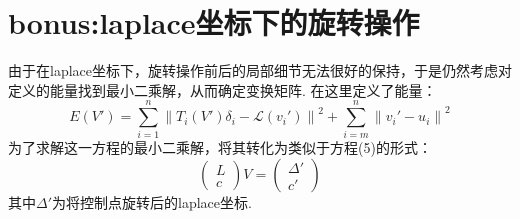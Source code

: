 \documentclass[12pt]{article}
\begin{document}
\begin{figure}[htbp]
    \centering
\end{figure}

\section{bonus:laplace坐标下的旋转操作}

由于在laplace坐标下，旋转操作前后的局部细节无法很好的保持，于是仍然考虑对定义的能量找到最小二乘解，从而确定变换矩阵. 在这里定义了能量：
\begin{equation}
    E(V')=\sum_{i=1}^{n} \left\lVert T_i (V') \delta _i- \mathcal{L}(v_i ')\right\rVert ^2+\sum_{i=m}^{n}\left\lVert v_i '-u_i\right\rVert ^2 
\end{equation}
为了求解这一方程的最小二乘解，将其转化为类似于方程(5)的形式：
\begin{equation}
    \begin{pmatrix}
        L\\
        c
    \end{pmatrix}
    V=
    \begin{pmatrix}
        \Delta'\\
        c'
    \end{pmatrix}
\end{equation}
其中$\Delta'$为将控制点旋转后的laplace坐标.
\end{document}
